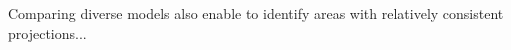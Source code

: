 \documentclass[11pt,letter]{article}
\begin{document}
Comparing diverse models also enable to identify areas with relatively consistent projections...

\end{document}
